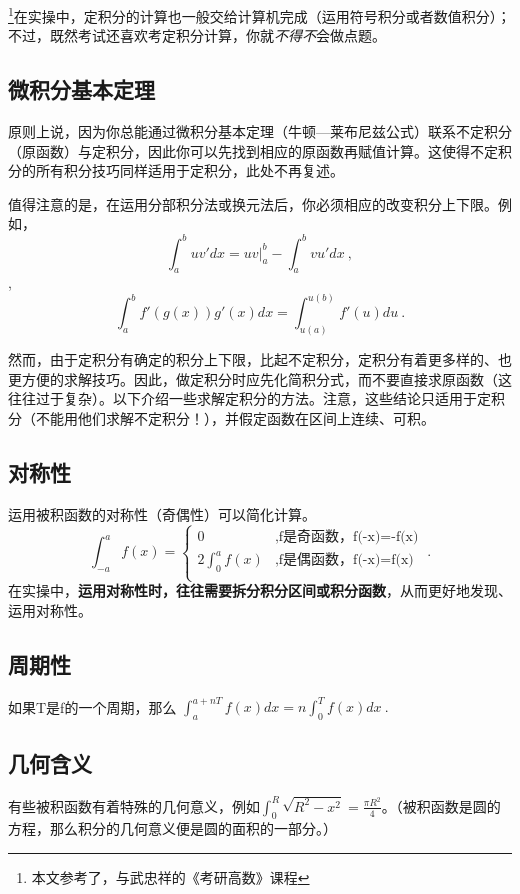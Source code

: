 
\begin{issues}
\issueDraft
\end{issues}


\footnote{本文参考了\cite{同济高}，\cite{Thomas}与武忠祥的《考研高数》课程}在实操中，定积分的计算也一般交给计算机完成（运用符号积分或者数值积分）；不过，既然考试还喜欢考定积分计算，你就\textsl{不得不}会做点题。

\subsection{微积分基本定理}
原则上说，因为你总能通过微积分基本定理（牛顿—莱布尼兹公式）联系不定积分（原函数）与定积分，因此你可以先找到相应的原函数再赋值计算。这使得不定积分的所有积分技巧同样适用于定积分，此处不再复述。

值得注意的是，在运用分部积分法或换元法后，你必须相应的改变积分上下限。例如，$$\int^b_a uv'dx = uv|^b_a-\int^b_a vu'dx~,$$, 
$$\int^b_a f'(g(x))g'(x)dx = \int ^{u(b)}_{u(a)} f'(u)du~.$$


然而，由于定积分有确定的积分上下限，比起不定积分，定积分有着更多样的、也更方便的求解技巧。因此，做定积分时应先化简积分式，而不要直接求原函数（这往往过于复杂）。以下介绍一些求解定积分的方法。注意，这些结论只适用于定积分（不能用他们求解不定积分！），并假定函数在区间上连续、可积。

\subsection{对称性}
运用被积函数的对称性（奇偶性）可以简化计算。
$$
\int ^a_{-a} f(x) = 
\left \{
\begin{aligned}
0&,\text{f是奇函数，f(-x)=-f(x)}\\
2\int ^a_0 f(x)&,\text{f是偶函数，f(-x)=f(x)}\\
\end{aligned}~.
\right.
$$
在实操中，\textbf{运用对称性时，往往需要拆分积分区间或积分函数}，从而更好地发现、运用对称性。

\subsection{周期性}
如果T是f的一个周期，那么 $\int ^{a+nT}_{a} f(x)dx= n\int^{T}_0 f(x)dx~.$

\subsection{几何含义}
有些被积函数有着特殊的几何意义，例如$\int ^R_0 \sqrt{R^2-x^2}=\frac{\pi R^2}{4}$。（被积函数是圆的方程，那么积分的几何意义便是圆的面积的一部分。）

